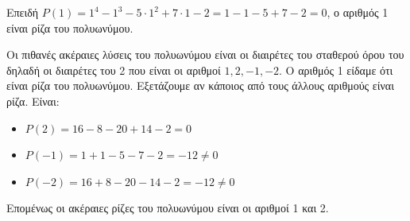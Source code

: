 \begin{alist}
\item Επειδή $P(1) = 1^4 - 1^3 - 5 \cdot 1^2 + 7 \cdot 1 - 2 = 1 - 1 - 5 + 7 - 2 = 0$, ο αριθμός 1 είναι ρίζα του πολυωνύμου.
\item Οι πιθανές ακέραιες λύσεις του πολυωνύμου είναι οι διαιρέτες του σταθερού όρου του δηλαδή οι διαιρέτες του 2 που είναι οι αριθμοί $1, 2, -1, -2$.
Ο αριθμός 1 είδαμε ότι είναι ρίζα του πολυωνύμου. Εξετάζουμε αν κάποιος από τους άλλους αριθμούς είναι ρίζα. Είναι:
\begin{itemize}
\item $P(2) = 16 - 8 - 20 + 14 - 2 = 0$
\item $P(-1) = 1 + 1 - 5 - 7 - 2 = -12 \ne 0$
\item $P(-2) = 16 + 8 - 20 - 14 - 2 = -12 \ne 0$
\end{itemize}
Επομένως οι ακέραιες ρίζες του πολυωνύμου είναι οι αριθμοί 1 και 2.
\end{alist}

